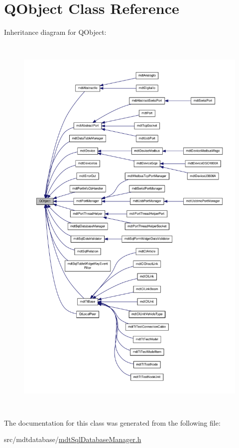 \hypertarget{class_q_object}{\section{Q\-Object Class Reference}
\label{class_q_object}
}


Inheritance diagram for Q\-Object\-:
\nopagebreak
\begin{figure}[H]
\begin{center}
\leavevmode
\includegraphics[height=550pt]{class_q_object__inherit__graph}
\end{center}
\end{figure}


The documentation for this class was generated from the following file\-:\begin{DoxyCompactItemize}
\item 
src/mdtdatabase/\hyperlink{mdt_sql_database_manager_8h}{mdt\-Sql\-Database\-Manager.\-h}\end{DoxyCompactItemize}
